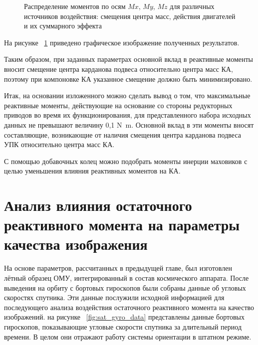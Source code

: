 \begin{figure}[ht]
	
	\caption{Распределение моментов по осям $Mx$, $My$, $Mz$ для различных источников воздействия: смещения центра масс, действия двигателей и их суммарного эффекта}
	\label{fig:momentBars}
\end{figure}

На рисунке ~\cref{fig:momentBars} приведено графическое изображение полученных результатов.

Таким образом, при заданных параметрах основной вклад в реактивные моменты вносит смещение центра карданова подвеса относительно центра масс КА, поэтому при компоновке КА указанное смещение должно быть минимизировано.

Итак, на основании изложенного можно сделать вывод о том, что максимальные реактивные моменты, действующие на основание со стороны редукторных приводов во время их функционирования, для представленного набора исходных данных не превышают величину 0,1 \si{\newton\metre}.  Основной вклад в эти моменты вносят составляющие, возникающие от наличия смещения центра карданова подвеса УПК относительно центра масс КА.

С помощью добавочных колец можно подобрать моменты инерции маховиков с целью уменьшения влияния реактивных моментов на КА.

\section{Анализ влияния остаточного реактивного момента на параметры качества изображения}

На основе параметров, рассчитанных в предыдущей главе, был изготовлен лётный образец ОМУ, интегрированный в состав космического аппарата. После выведения на орбиту с бортовых гироскопов были собраны данные об угловых скоростях спутника. Эти данные послужили исходной информацией для последующего анализа воздействия остаточного реактивного момента на качество изображений. на рисунке ~\cref{fig:sat_gyro_data} представлены данные бортовых гироскопов, показывающие угловые скорости спутника за длительный период времени. В целом они отражают работу системы ориентации в штатном режиме.

